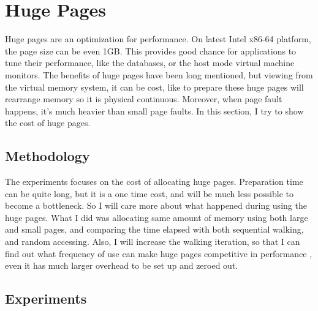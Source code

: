 \section{Huge Pages}
	\label{sec:hugepage}
Huge pages are an optimization for performance. On latest Intel x86-64
platform, the page size can be even 1GB. This provides good chance for
applications to tune their performance, like the databases, or the host mode
virtual machine monitors. The benefits of huge pages have been long mentioned,
but viewing from the virtual memory system, it can be cost, like to prepare
these huge pages will rearrange memory so it is physical continuous. Moreover,
when page fault happens, it's much heavier than small page faults. In this
section, I try to show the cost of huge pages.

\subsection{Methodology}
The experiments focuses on the cost of allocating huge pages. Preparation time
can be quite long, but it is a one time cost, and will be much less possible to
become a bottleneck. So I will care more about what happened during using the
huge pages. What I did was allocating same amount of memory using both large
and small pages, and comparing the time elapsed with both sequential walking,
and random accessing. Also, I will increase the walking iteration, so that I
can find out what frequency of use can make huge pages competitive in
performance , even it has much larger overhead to be set up and zeroed out.

\subsection{Experiments}

